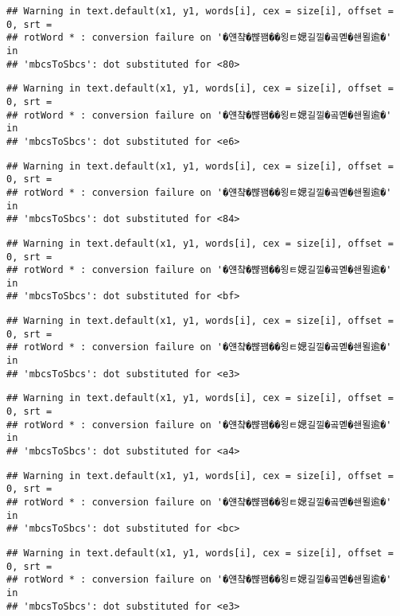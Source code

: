 \documentclass[]{article}
\begin{document}
\begin{verbatim}
## Warning in text.default(x1, y1, words[i], cex = size[i], offset = 0, srt =
## rotWord * : conversion failure on '�얜챸�뺞꽴��욍ㅌ媤길낄�곸몓�쇈묄逾�' in
## 'mbcsToSbcs': dot substituted for <80>
\end{verbatim}

\begin{verbatim}
## Warning in text.default(x1, y1, words[i], cex = size[i], offset = 0, srt =
## rotWord * : conversion failure on '�얜챸�뺞꽴��욍ㅌ媤길낄�곸몓�쇈묄逾�' in
## 'mbcsToSbcs': dot substituted for <e6>
\end{verbatim}

\begin{verbatim}
## Warning in text.default(x1, y1, words[i], cex = size[i], offset = 0, srt =
## rotWord * : conversion failure on '�얜챸�뺞꽴��욍ㅌ媤길낄�곸몓�쇈묄逾�' in
## 'mbcsToSbcs': dot substituted for <84>
\end{verbatim}

\begin{verbatim}
## Warning in text.default(x1, y1, words[i], cex = size[i], offset = 0, srt =
## rotWord * : conversion failure on '�얜챸�뺞꽴��욍ㅌ媤길낄�곸몓�쇈묄逾�' in
## 'mbcsToSbcs': dot substituted for <bf>
\end{verbatim}

\begin{verbatim}
## Warning in text.default(x1, y1, words[i], cex = size[i], offset = 0, srt =
## rotWord * : conversion failure on '�얜챸�뺞꽴��욍ㅌ媤길낄�곸몓�쇈묄逾�' in
## 'mbcsToSbcs': dot substituted for <e3>
\end{verbatim}

\begin{verbatim}
## Warning in text.default(x1, y1, words[i], cex = size[i], offset = 0, srt =
## rotWord * : conversion failure on '�얜챸�뺞꽴��욍ㅌ媤길낄�곸몓�쇈묄逾�' in
## 'mbcsToSbcs': dot substituted for <a4>
\end{verbatim}

\begin{verbatim}
## Warning in text.default(x1, y1, words[i], cex = size[i], offset = 0, srt =
## rotWord * : conversion failure on '�얜챸�뺞꽴��욍ㅌ媤길낄�곸몓�쇈묄逾�' in
## 'mbcsToSbcs': dot substituted for <bc>
\end{verbatim}

\begin{verbatim}
## Warning in text.default(x1, y1, words[i], cex = size[i], offset = 0, srt =
## rotWord * : conversion failure on '�얜챸�뺞꽴��욍ㅌ媤길낄�곸몓�쇈묄逾�' in
## 'mbcsToSbcs': dot substituted for <e3>
\end{verbatim}
\end{document}
